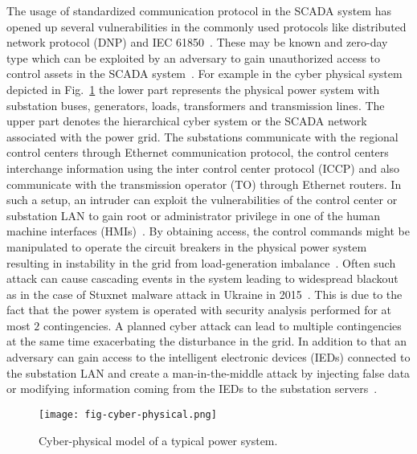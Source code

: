 The usage of standardized communication protocol in the SCADA system has opened up several vulnerabilities in the commonly used protocols like distributed network protocol (DNP) and IEC 61850~\cite{iec61850}. These may be known and zero-day type which can be exploited by an adversary to gain unauthorized access to control assets in the SCADA system~\cite{wang1}. For example in the cyber physical system depicted in Fig.~\ref{fig:cyber-physical} the lower part represents the physical power system with substation buses, generators, loads, transformers and transmission lines. The upper part denotes the hierarchical cyber system or the SCADA network associated with the power grid. The substations communicate with the regional control centers through Ethernet communication protocol, the control centers interchange information using the inter control center protocol (ICCP) and also communicate with the transmission operator (TO) through Ethernet routers. In such a setup, an intruder can exploit the vulnerabilities of the control center or substation LAN to gain root or administrator privilege in one of the human machine interfaces (HMIs)~\cite{ten_main}. By obtaining access, the control commands might be manipulated to operate the circuit breakers in the physical power system resulting in instability in the grid from load-generation imbalance~\cite{attack}. Often such attack can cause cascading events in the system leading to widespread blackout as in the case of Stuxnet malware attack in Ukraine in 2015~\cite{ukraine1,ukraine2}. This is due to the fact that the power system is operated with security analysis performed for at most $2$ contingencies. A planned cyber attack can lead to multiple contingencies at the same time exacerbating the disturbance in the grid. In addition to that an adversary can gain access to the intelligent electronic devices (IEDs) connected to the substation LAN and create a man-in-the-middle attack by injecting false data or modifying information coming from the IEDs to the substation servers~\cite{maninmiddle}.
\begin{figure}
	\centering
	\texttt{[image: fig-cyber-physical.png]}
	\caption{Cyber-physical model of a typical power system.}
	\label{fig:cyber-physical}
\end{figure}


